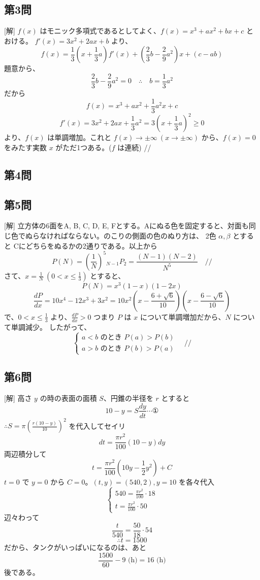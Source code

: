 \documentclass[../main.tex]{subfiles}
\begin{document}
\subsection*{第3問}
[解] $f(x)$ はモニック多項式であるとしてよく、$f(x) = x^3 + ax^2 + bx + c$ とおける。
$f'(x) = 3x^2 + 2ax + b$ より、
\[ f(x) = \frac{1}{3}\left(x + \frac{1}{3}a\right)f'(x) + \left(\frac{2}{3}b - \frac{2}{9}a^2\right)x + (c - ab) \]
題意から、
\[ \frac{2}{3}b - \frac{2}{9}a^2 = 0 \quad \therefore \quad b = \frac{1}{3}a^2 \]
だから
\[ f(x) = x^3 + ax^2 + \frac{1}{3}a^2 x + c \]
\[ f'(x) = 3x^2 + 2ax + \frac{1}{3}a^2 = 3\left(x + \frac{1}{3}a\right)^2 \ge 0 \]
より、$f(x)$ は単調増加。これと $f(x) \to \pm\infty \ (x \to \pm\infty)$ から、$f(x) = 0$ をみたす実数 $x$ がただ1つある。($f$ は連続) //

\subsection*{第4問}

\subsection*{第5問}
[解] 立方体の6面をA, B, C, D, E, Fとする。Aにぬる色を固定すると、対面も同じ色でぬらなければならない。のこりの側面の色のぬり方は、
2色 $\alpha, \beta$ とすると Cにどちらをぬるかの2通りである。以上から
\[ P(N) = \left(\frac{1}{N}\right)^5 {}_{N-1}P_2 = \frac{(N-1)(N-2)}{N^5} \quad \text{//} \]
さて、$x = \frac{1}{N} \ (0 < x \le \frac{1}{3})$ とすると、
\[ P(N) = x^3(1-x)(1-2x) \]
\[ \frac{dP}{dx} = 10x^4 - 12x^3 + 3x^2 = 10x^2 \left(x - \frac{6+\sqrt{6}}{10}\right)\left(x - \frac{6-\sqrt{6}}{10}\right) \]
で、$0 < x \le \frac{1}{3}$ より、$\frac{dP}{dx} > 0$ つまり $P$ は $x$ について単調増加だから、$N$ について単調減少。
したがって、
\[
  \begin{cases} a < b \text{ のとき } P(a) > P(b) \\ a > b \text{ のとき } P(b) > P(a)
\end{cases} \quad \text{//} \]

\subsection*{第6問}
[解] 高さ $y$ の時の表面の面積 $S$、円錐の半径を $r$ とすると
\[ 10 - y = S \frac{dy}{dt} \cdots \text{①} \]
$\therefore S = \pi \left( \frac{r(10-y)}{10} \right)^2$ を代入してセイリ
\[ dt = \frac{\pi r^2}{100}(10-y)dy \]
両辺積分して
\[ t = \frac{\pi r^2}{100}\left(10y - \frac{1}{2}y^2\right) + C \]
$t=0$ で $y=0$ から $C=0$。$(t, y) = (540, 2), y=10$ を各々代入
\[
  \begin{cases} 540 = \frac{\pi r^2}{100} \cdot 18 \\ t = \frac{\pi r^2}{100} \cdot 50
\end{cases} \]
辺々わって
\[ \frac{t}{540} = \frac{50}{18} \cdot 54 \]
\[ \therefore t = 1500 \]
だから、タンクがいっぱいになるのは、あと
\[ \frac{1500}{60} - 9 \text{ (h)} = 16 \text{ (h)} \]
後である。
\end{document}
